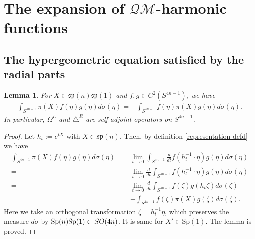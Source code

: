 \documentclass[a4paper,11pt]{amsart}
\numberwithin{equation}{section}
\newtheorem{lem}{Lemma}[section]
\begin{document}
\section{The expansion of $\mathcal{QM}$-harmonic functions}
\subsection{The hypergeometric equation satisfied by the radial parts}
\begin{lem}\label{int by part}
For $X\in \mathfrak{sp}(n)\mathfrak{sp}(1)$ and $f,g\in C^2(S^{4n-1})$, we have
\begin{equation*}\begin{aligned}
\int_{S^{4n-1}}\pi(X) f(\eta)g(\eta)d\sigma(\eta)=-\int_{S^{4n-1}}f(\eta)\pi(X) g(\eta)d\sigma(\eta).
\end{aligned}\end{equation*}
In particular, $\Omega^L$ and $\triangle^R$ are self-adjoint operators on $S^{4n-1}$.
\end{lem}
\begin{proof}
Let $h_t:=e^{tX}$ with $X\in \mathfrak{sp}(n)$. Then, by definition \eqref{representation defd} we have
\begin{equation*}\begin{aligned}
\int_{S^{4n-1}}\pi(X) f(\eta)g(\eta)d\sigma(\eta)=&\lim_{t\rightarrow 0}\int_{S^{4n-1}} \frac{d}{dt}f(h_t^{-1}\cdot \eta)g(\eta)d\sigma(\eta)\\
=& \lim_{t\rightarrow 0}\frac{d}{dt}\int_{S^{4n-1}} f(h_t^{-1}\cdot\eta)g(\eta)d\sigma(\eta)\\
=&\lim_{t\rightarrow 0}\frac{d}{dt}\int_{S^{4n-1}}f(\zeta) g(h_{t}\zeta)d\sigma(\zeta)\\
=&-\int_{S^{4n-1}}f(\zeta)\pi(X) g(\zeta)d\sigma(\zeta).
\end{aligned}\end{equation*}
Here we take an orthogonal transformation $\zeta=h_t^{-1}\eta$, which preserves the measure $d\sigma$ by ${\rm Sp}(n){\rm Sp}(1)\subset SO(4n)$. It is same for $X'\in$Sp$(1)$. The lemma is proved.
\end{proof}
\end{document}
